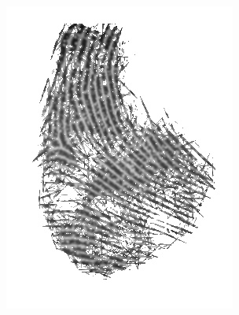 \documentclass{beamer}
\begin{document}
{\begin{figure}[!ht]
\begin{subfigure}[ht]{0.15\textwidth}
            \includegraphics[width=\textwidth]{fingerprints/2004Db4a/1_3_filtered.jpg}
        \end{subfigure}
    \end{figure}
}
\end{document}
